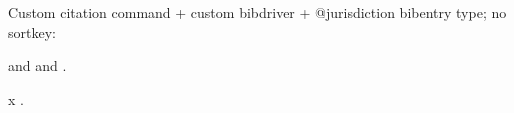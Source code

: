 %
{%
%
}%
{%
}%
{%
\multicitedelim%
}%
{%
%
}

%




\usepackage[
				bookmarks,
            colorlinks=true,        
            allcolors = black,  
            citecolor=blue, 
            hyperindex=false,       
]{hyperref}








Custom citation command + custom bibdriver + @jurisdiction bibentry type; no sortkey:

 and  and .

x \parencite{reese,kullback:related,aristotle:anima}.

\printbibliography%
 
